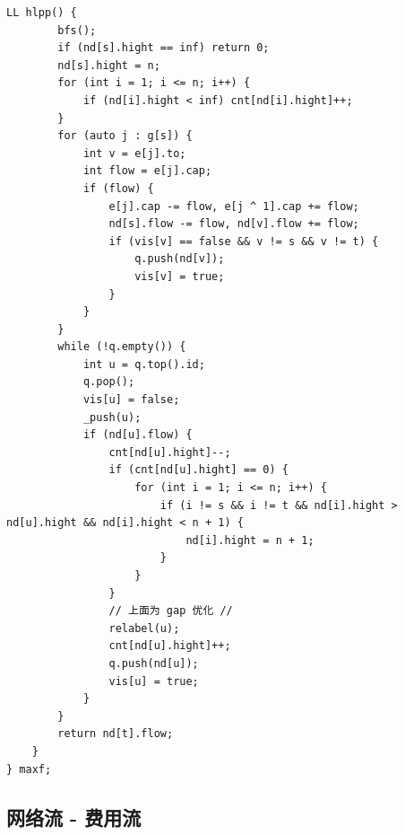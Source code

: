 \documentclass[UTF8, a4paper, titlepage, twoside]{ctexart}
\begin{document}
\begin{lstlisting}[style=cpp]
    LL hlpp() {
        bfs();
        if (nd[s].hight == inf) return 0;
        nd[s].hight = n;
        for (int i = 1; i <= n; i++) {
            if (nd[i].hight < inf) cnt[nd[i].hight]++;
        }
        for (auto j : g[s]) {
            int v = e[j].to;
            int flow = e[j].cap;
            if (flow) {
                e[j].cap -= flow, e[j ^ 1].cap += flow;
                nd[s].flow -= flow, nd[v].flow += flow;
                if (vis[v] == false && v != s && v != t) {
                    q.push(nd[v]);
                    vis[v] = true;
                }
            }
        }
        while (!q.empty()) {
            int u = q.top().id;
            q.pop();
            vis[u] = false;
            _push(u);
            if (nd[u].flow) {
                cnt[nd[u].hight]--;
                if (cnt[nd[u].hight] == 0) {
                    for (int i = 1; i <= n; i++) {
                        if (i != s && i != t && nd[i].hight > nd[u].hight && nd[i].hight < n + 1) {
                            nd[i].hight = n + 1;
                        }
                    }
                }
                // 上面为 gap 优化 //
                relabel(u);
                cnt[nd[u].hight]++;
                q.push(nd[u]);
                vis[u] = true;
            }
        }
        return nd[t].flow;
    }
} maxf;
\end{lstlisting}

\subsection{ 网络流 - 费用流 }
\end{document}
